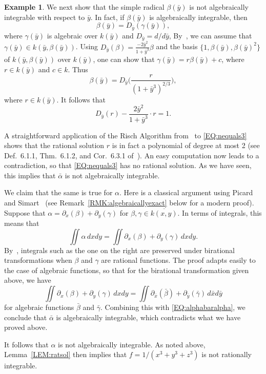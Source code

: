 \documentclass{amsart}
\theoremstyle{definition}
\newtheorem{example}[thm]{Example}
\numberwithin{equation}{section}
\numberwithin{thm}{section}
\begin{document}
\begin{example}
We next show that the simple radical $\beta(\bar{y})$ is not algebraically integrable with respect to $\bar{y}$. In fact, if $\beta(\bar{y})$ is algebraically integrable, then
\[ \beta(\bar{y})=D_{\bar{y}} (\gamma(\bar y)), \]
where $\gamma(\bar y)$ is algebraic over $k(\bar y)$ and $D_{\bar y} = d/d{\bar y}$,   By~\cite[Lemma 5.1.1]{Bronstein}, we can assume that $\gamma(\bar y) \in k(\bar y, \beta(\bar y))$. 
Using $D_{\bar y}(\beta) = \frac{-2\bar{y}^2}{1+\bar{y}^3} \beta$ and the basis $\{1,\beta(\bar y),\beta(\bar y)^2\}$ of $k(\bar y, \beta(\bar y))$ over $k(\bar y)$, one can show that $\gamma(\bar y) = r\beta(\bar y) + c$, where  $r \in k(\bar{y})$ and $c \in k$.  Thus
\[ 
\beta(\bar{y})=D_{\bar{y}} \bigg(\frac{r}{(1+\bar{y}^3)^{2/3}}\bigg), 
\]
where $r \in k(\bar{y})$.  It follows that
\begin{equation}\label{EQ:nequals3}
D_{\bar{y}}(r)-\frac{2\bar{y}^2}{1+\bar{y}^3}\cdot r =1.
\end{equation}

A straightforward application of the Risch Algorithm from~\cite[Ch.\ 6]{Bronstein} to \eqref{EQ:nequals3} shows that the rational solution $r$ is in fact a polynomial of degree at most 2 (see Def.\ 6.1.1, Thm.\ 6.1.2, and Cor.\ 6.3.1 of~\cite{Bronstein}).  An easy computation now leads to a contradiction, so that \eqref{EQ:nequals3} has no rational solution. As we have seen, this implies that $\bar \alpha$ is not algebraically integrable.

We claim that the same is true for $\alpha$.   Here is a classical argument using Picard and Simart~\cite{picard1897} (see Remark~\ref{RMK:algebraicallyexact} below for a modern proof). Suppose that $\alpha = \partial_x(\beta) + \partial_y(\gamma)$ for $\beta,\gamma \in \overline{k(x, y)}$.  In terms of integrals, this means that
\[
\iint \alpha\,dxdy = \iint  \partial_x(\beta) + \partial_y(\gamma)\,dxdy.
\]
By~\cite[Vol.\ II, pp.~160--161]{picard1897}, integrals such as the one on the right are preserved under birational transformations when $\beta$ and $\gamma$ are rational functions.  The proof adapts easily to the case of algebraic functions, so that for the birational transformation given above, we have
\[
 \iint  \partial_x(\beta) + \partial_y(\gamma)\,dxdy =  \iint  \partial_{\bar x}(\bar\beta) + \partial_{\bar y}(\bar\gamma)\,d\bar x d\bar y
\]
for algebraic functions $\bar\beta$ and $\bar\gamma$.  Combining this with \eqref{EQ:alphabaralpha}, we conclude that $\bar \alpha$ is algebraically integrable, which contradicts what we have proved above.

It follows that $\alpha$ is not algebraically integrable.  As noted above, Lemma~\ref{LEM:ratsol} then implies that $f = 1/(x^3+y^3+z^3)$ is not rationally integrable.
\end{example}
\end{document}
